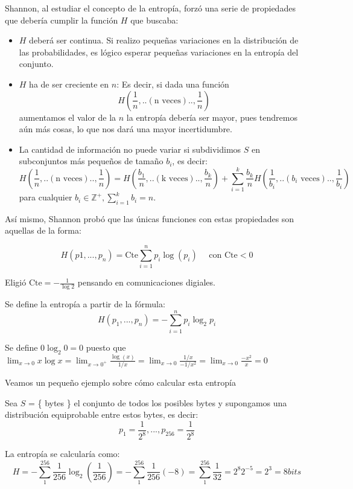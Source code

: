 	Shannon, al estudiar el concepto de la entropía, forzó una serie de propiedades que debería cumplir la función $H$ que buscaba:
	\begin{itemize}
		\item $H$ deberá ser continua. Si realizo pequeñas variaciones en la distribución de las probabilidades, es lógico esperar pequeñas variaciones en la entropía del conjunto.

		\item $H$ ha de ser creciente en $n$: Es decir, si dada una función
		\[H\left(\frac{1}{n},..(\text{n veces})..,\frac{1}{n}\right)  \]
		 aumentamos el valor de la $n$ la entropía debería ser mayor, pues tendremos aún más cosas, lo que nos dará una mayor incertidumbre.
		\item La cantidad de información no puede variar si subdividimos $S$ en subconjuntos más pequeños de tamaño $b_i$, es decir:
		\[H\left(\frac{1}{n},..(\text{n veces})..,\frac{1}{n}\right) =  H\left(\frac{b_1}{n},..(\text{k veces})..,\frac{b_k}{n}\right) + \sum^{k}_{i = 1} \frac{b_k}{n} H\left(\frac{1}{b_i},..(b_i \text{ veces})..,\frac{1}{b_i}\right) \] para cualquier $b_i \in \mathbb{Z}^+, \sum^{k}_{i = 1} b_i = n$.
	\end{itemize}


	Así mismo, Shannon probó que las únicas funciones con estas propiedades son aquellas de la forma:

	$$H(p1, ..., p_n) = \text{Cte} \sum^{n}_{i=1} p_i \log(p_i) \quad \text{ con } \text{Cte} < 0 $$

	Eligió $\text{Cte} = -\frac{1}{\log 2}$ pensando en comunicaciones digiales.

	\begin{defn}[Entropia]
		Se define la entropía a partir de la fórmula:
		$$H(p_1, ..., p_n) = -\sum^{n}_{i = 1} p_i \log_2 p_i $$

		Se define $0 \log_2 0 = 0$ puesto que $\lim_{x \rightarrow 0} x \log x = \lim_{x \rightarrow 0^+} \frac{\log(x)}{1/x} = \lim_{x \rightarrow 0} \frac{1/x}{-1 / x^2} = \lim_{x \rightarrow 0} \frac{-x^2}{x} = 0$
	\end{defn}

	Veamos un pequeño ejemplo sobre cómo calcular esta entropía

	\begin{example}

		Sea $S$ = \{ bytes \} el conjunto de todos los posibles bytes y supongamos una distribución equiprobable entre estos bytes, es decir:
		\[p_1 = \frac{1}{2^8}, ..., p_{256} = \frac{1}{2^8}\]

		La entropía se calcularía como:
		$$  H = - \sum_{1}^{256} \frac{1}{256} \log_2 (\frac{1}{256}) = - \sum_{1}^{256} \frac{1}{256} (-8) = \sum_{1}^{256} \frac{1}{32} = 2^8 2^{-5} = 2^3 = 8 bits$$

	\end{example}

